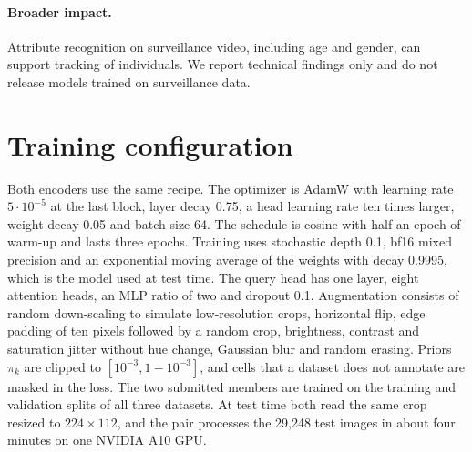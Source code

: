 \documentclass[10pt,twocolumn,letterpaper]{article}
\begin{document}
\paragraph{Broader impact.} Attribute recognition on surveillance video, including age and gender, can support tracking of individuals. We report technical findings only and do not release models trained on surveillance data.

{\small


}

\clearpage
\appendix
\section{Training configuration}
\label{app:config}

Both encoders use the same recipe. The optimizer is AdamW with learning rate $5\cdot10^{-5}$ at the last block, layer decay 0.75, a head learning rate ten times larger, weight decay 0.05 and batch size 64. The schedule is cosine with half an epoch of warm-up and lasts three epochs. Training uses stochastic depth 0.1, bf16 mixed precision and an exponential moving average of the weights with decay 0.9995, which is the model used at test time. The query head has one layer, eight attention heads, an MLP ratio of two and dropout 0.1. Augmentation consists of random down-scaling to simulate low-resolution crops, horizontal flip, edge padding of ten pixels followed by a random crop, brightness, contrast and saturation jitter without hue change, Gaussian blur and random erasing. Priors $\pi_k$ are clipped to $[10^{-3},1-10^{-3}]$, and cells that a dataset does not annotate are masked in the loss. The two submitted members are trained on the training and validation splits of all three datasets. At test time both read the same crop resized to $224\times112$, and the pair processes the 29{,}248 test images in about four minutes on one NVIDIA A10 GPU.
\end{document}
